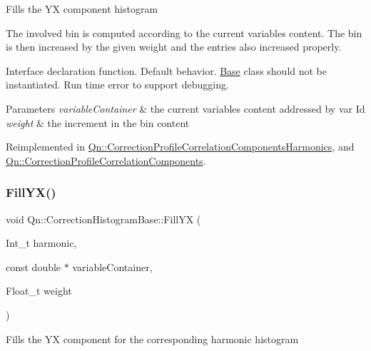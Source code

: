Fills the YX component histogram

The involved bin is computed according to the current variables content. The bin is then increased by the given weight and the entries also increased properly.

Interface declaration function. Default behavior. \mbox{\hyperlink{classBase}{Base}} class should not be instantiated. Run time error to support debugging.


\begin{DoxyParams}{Parameters}
{\em variable\+Container} & the current variables content addressed by var Id \\
\hline
{\em weight} & the increment in the bin content \\
\hline
\end{DoxyParams}


Reimplemented in \mbox{\hyperlink{classQn_1_1CorrectionProfileCorrelationComponentsHarmonics_a04d5ba4313e4ebab81ffe203970c8cf3}{Qn\+::\+Correction\+Profile\+Correlation\+Components\+Harmonics}}, and \mbox{\hyperlink{classQn_1_1CorrectionProfileCorrelationComponents_a8c011aed3281ab3d9fd8fd83e43ad384}{Qn\+::\+Correction\+Profile\+Correlation\+Components}}.

\mbox{\label{classQn_1_1CorrectionHistogramBase_a3acc9d80584f1909771f3fcaac98d5e4}} 
\subsubsection{\texorpdfstring{Fill\+Y\+X()}{FillYX()}\hspace{0.1cm}{\footnotesize\ttfamily [2/2]}}
{\footnotesize\ttfamily void Qn\+::\+Correction\+Histogram\+Base\+::\+Fill\+YX (\begin{DoxyParamCaption}\item[{Int\+\_\+t}]{harmonic,  }\item[{const double $\ast$}]{variable\+Container,  }\item[{Float\+\_\+t}]{weight }\end{DoxyParamCaption})\hspace{0.3cm}{\ttfamily [virtual]}}

Fills the YX component for the corresponding harmonic histogram

